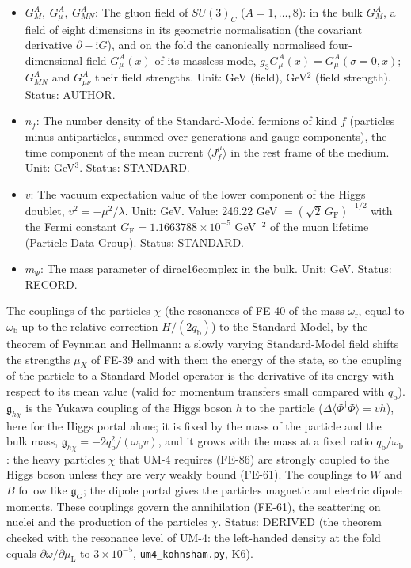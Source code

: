 \documentclass[
  10pt,
]{article}
\begin{document}
\begin{itemize}
  the QCD vacuum, a thermal value in the plasma). Unit: GeV\(^4\).
  Status: STANDARD.
\item
  \(G^A_M,\ G^A_\mu,\ G^A_{MN}\): The gluon field of \(SU(3)_C\)
  (\(A = 1, \dots, 8\)): in the bulk \(G^A_M\), a field of eight
  dimensions in its geometric normalisation (the covariant derivative
  \(\partial - \mathrm{i}G\)), and on the fold the canonically
  normalised four-dimensional field \(G^A_\mu(x)\) of its massless mode,
  \(g_3G^A_\mu(x) = G^A_\mu(\sigma = 0, x)\); \(G^A_{MN}\) and
  \(G^A_{\mu\nu}\) their field strengths. Unit: GeV (field), GeV\(^2\)
  (field strength). Status: AUTHOR.
\item
  \(n_f\): The number density of the Standard-Model fermions of kind
  \(f\) (particles minus antiparticles, summed over generations and
  gauge components), the time component of the mean current
  \(\langle J_f^\mu\rangle\) in the rest frame of the medium. Unit:
  GeV\(^3\). Status: STANDARD.
\item
  \(v\): The vacuum expectation value of the lower component of the
  Higgs doublet, \(v^2 = -\mu^2/\lambda\). Unit: GeV. Value: 246.22 GeV
  \(= (\sqrt2\,G_{\mathrm{F}})^{-1/2}\) with the Fermi constant
  \(G_{\mathrm{F}} = 1.1663788\times10^{-5}\) GeV\(^{-2}\) of the muon
  lifetime (Particle Data Group). Status: STANDARD.
\item
  \(m_\Psi\): The mass parameter of dirac16complex in the bulk. Unit:
  GeV. Status: RECORD.
\end{itemize}

The couplings of the particles \(\chi\) (the resonances of FE-40 of the
mass \(\omega_{\mathrm{r}}\), equal to \(\omega_{\mathrm{b}}\) up to the
relative correction \(H/(2q_{\mathrm{b}})\)) to the Standard Model, by
the theorem of Feynman and Hellmann: a slowly varying Standard-Model
field shifts the strengths \(\mu_X\) of FE-39 and with them the energy
of the state, so the coupling of the particle to a Standard-Model
operator is the derivative of its energy with respect to its mean value
(valid for momentum transfers small compared with \(q_{\mathrm{b}}\)).
\(\mathfrak{g}_{h\chi}\) is the Yukawa coupling of the Higgs boson \(h\)
to the particle (\(\Delta\langle\Phi^\dagger\Phi\rangle = vh\)), here
for the Higgs portal alone; it is fixed by the mass of the particle and
the bulk mass,
\(\mathfrak{g}_{h\chi} = -2q_{\mathrm{b}}^2/(\omega_{\mathrm{b}}v)\),
and it grows with the mass at a fixed ratio
\(q_{\mathrm{b}}/\omega_{\mathrm{b}}\): the heavy particles \(\chi\)
that UM-4 requires (FE-86) are strongly coupled to the Higgs boson
unless they are very weakly bound (FE-61). The couplings to \(W\) and
\(B\) follow like \(\mathfrak{g}_{G}\); the dipole portal gives the
particles magnetic and electric dipole moments. These couplings govern
the annihilation (FE-61), the scattering on nuclei and the production of
the particles \(\chi\). Status: DERIVED (the theorem checked with the
resonance level of UM-4: the left-handed density at the fold equals
\(\partial\omega/\partial\mu_{\mathrm{L}}\) to \(3\times10^{-5}\),
\texttt{um4\_kohnsham.py}, K6).
\end{document}
